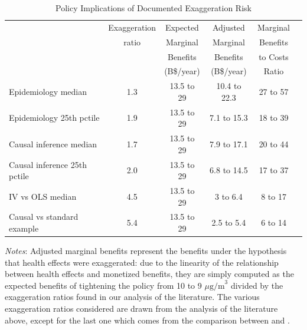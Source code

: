 \begin{table}[!ht]
	\caption{Policy Implications of Documented Exaggeration Risk}
	\label{tab:policy_implications}
	\centering
		\begin{threeparttable}
                		\begin{tabular}{lccccc}
                    		\toprule
                    			 & Exaggeration & Expected  & Adjusted  & Marginal\\ 
			 		 & ratio & Marginal & Marginal  & Benefits \\
			 		 &  & Benefits & Benefits & to Costs \\ 
			 		 &  &  (B\$/year) & (B\$/year) & Ratio \\ 
				\midrule
Epidemiology median & 1.3 & 13.5 to 29 & 10.4 to 22.3 & 27 to 57\\
Epidemiology 25th pctile & 1.9 & 13.5 to 29 & 7.1 to 15.3 & 18 to 39\\
Causal inference median & 1.7 & 13.5 to 29 & 7.9 to 17.1 & 20 to 44\\
Causal inference 25th pctile & 2.0 & 13.5 to 29 & 6.8 to 14.5 & 17 to 37\\
IV vs OLS median & 4.5 & 13.5 to 29 & 3 to 6.4 & 8 to 17\\
Causal vs standard example & 5.4 & 13.5 to 29 & 2.5 to 5.4 & 6 to 14\\
                    		\bottomrule
                \end{tabular}
                \begin{tablenotes}
                    \footnotesize
                    \item \textit{Notes}: Adjusted marginal benefits represent the benefits under the hypothesis that health effects were exaggerated: due to the linearity of the relationship between health effects and monetized benefits, they are simply computed as the expected benefits of tightening the policy from 10 to 9 $\mu\text{g/m}^3$ divided by the exaggeration ratios found in our analysis of the literature. The various exaggeration ratios considered are drawn from the analysis of the literature above, except for the last one which comes from the comparison between \cite{schwartz_estimating_2015} and \cite{zanobetti_effect_2009}.
                \end{tablenotes}
            \end{threeparttable}
\end{table}